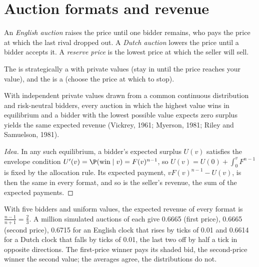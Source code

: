 \section{Auction formats and revenue}

\begin{definition}\label{def:qm:games-auctions-and-information:open}
An \emph{English auction} raises the price until one bidder remains, who pays the price at which the last rival dropped out. A \emph{Dutch auction} lowers the price
until a bidder accepts it. A \emph{reserve price} is the lowest price at which the seller will sell.
\end{definition}

The  is strategically a  with private values (stay in until the price reaches your value), and the  is a  (choose the price at which to stop).

\begin{theorem}\label{thm:qm:games-auctions-and-information:re}
With independent private values drawn from a common continuous distribution and risk-neutral bidders, every auction in which the highest value wins in equilibrium and a bidder with the lowest possible value
expects zero surplus yields the same expected revenue (Vickrey, 1961; Myerson, 1981; Riley and Samuelson, 1981).
\end{theorem}

\begin{proof}[Idea]
In any such equilibrium, a bidder's expected surplus $U(v)$ satisfies the envelope condition $U'(v) = \P(\text{win} \mid v) = F(v)^{n-1}$, so $U(v) = U(0) + \int_0^vF^{n-1}$ is fixed by the allocation rule. Its
expected payment, $vF(v)^{n-1} - U(v)$, is then the same in every format, and so is the seller's revenue, the sum of the expected payments.
\end{proof}

With five bidders and uniform values, the expected revenue of every format is $\frac{n-1}{n+1} = \frac23$. A million simulated auctions of each give 0.6665 (first price), 0.6665 (second price), 0.6715 for
an English clock that rises by ticks of 0.01 and 0.6614 for a Dutch clock that falls by ticks of 0.01, the last two off by half a tick in opposite directions. The first-price winner pays its shaded bid, the
second-price winner the second value; the averages agree, the distributions do not.

